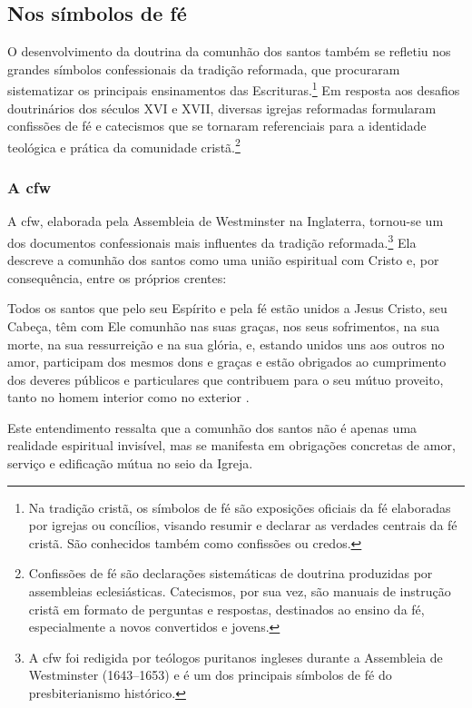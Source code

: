 \subsection{Nos símbolos de fé}

O desenvolvimento da doutrina da comunhão dos santos também se refletiu nos grandes símbolos confessionais da tradição reformada, que procuraram sistematizar os principais ensinamentos das Escrituras.\footnote{Na tradição cristã, os símbolos de fé são exposições oficiais da fé elaboradas por igrejas ou concílios, visando resumir e declarar as verdades centrais da fé cristã. São conhecidos também como confissões ou credos.} Em resposta aos desafios doutrinários dos séculos XVI e XVII, diversas igrejas reformadas formularam confissões de fé e catecismos que se tornaram referenciais para a identidade teológica e prática da comunidade cristã.\footnote{Confissões de fé são declarações sistemáticas de doutrina produzidas por assembleias eclesiásticas. Catecismos, por sua vez, são manuais de instrução cristã em formato de perguntas e respostas, destinados ao ensino da fé, especialmente a novos convertidos e jovens.}

\subsubsection{A \gls{cfw}} 
A \gls{cfw}, elaborada pela Assembleia de Westminster na Inglaterra, tornou-se um dos documentos confessionais mais influentes da tradição reformada.\footnote{A \gls{cfw} foi redigida por teólogos puritanos ingleses durante a Assembleia de Westminster (1643–1653) e é um dos principais símbolos de fé do presbiterianismo histórico.} Ela descreve a comunhão dos santos como uma união espiritual com Cristo e, por consequência, entre os próprios crentes:
\begin{citacao}
Todos os santos que pelo seu Espírito e pela fé estão unidos a Jesus Cristo, seu Cabeça, têm com Ele comunhão nas suas graças, nos seus sofrimentos, na sua morte, na sua ressurreição e na sua glória, e, estando unidos uns aos outros no amor, participam dos mesmos dons e graças e estão obrigados ao cumprimento dos deveres públicos e particulares que contribuem para o seu mútuo proveito, tanto no homem interior como no exterior \cite[Cap.~XXVI, §~1º]{cfw}.
\end{citacao}

Este entendimento ressalta que a comunhão dos santos não é apenas uma realidade espiritual invisível, mas se manifesta em obrigações concretas de amor, serviço e edificação mútua no seio da Igreja.

